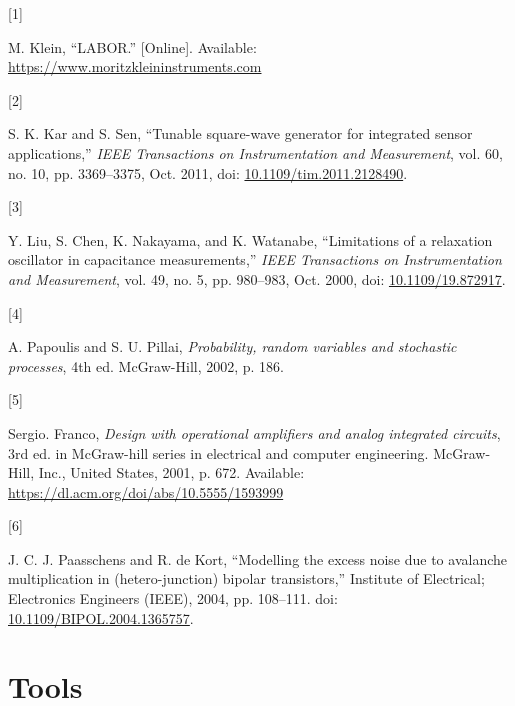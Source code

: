 \documentclass[
  11pt,
  a4paper,
  twoside]{scrbook}
\newlength{\cslhangindent}
\newlength{\csllabelwidth}
\newenvironment{CSLReferences}[2] %
 {\begin{list}{}{%
  \setlength{\itemindent}{0pt}
  \setlength{\leftmargin}{0pt}
  \setlength{\parsep}{0pt}
  \ifodd #1
   \setlength{\leftmargin}{\cslhangindent}
   \setlength{\itemindent}{-1\cslhangindent}
  \fi
  \setlength{\itemsep}{#2\baselineskip}}}
 {\end{list}}
\newcommand{\CSLLeftMargin}[1]{\parbox[t]{\csllabelwidth}{\strut#1\strut}}
\newcommand{\CSLRightInline}[1]{\parbox[t]{\linewidth - \csllabelwidth}{\strut#1\strut}}
\begin{document}

\protect{}\label{refs}
\begin{CSLReferences}{0}{0}
\CSLLeftMargin{{[}1{]} }%
\CSLRightInline{M. Klein, {``LABOR.''} {[}Online{]}. Available:
\url{https://www.moritzkleininstruments.com}}

\CSLLeftMargin{{[}2{]} }%
\CSLRightInline{S. K. Kar and S. Sen, {``Tunable square-wave generator
for integrated sensor applications,''} \emph{IEEE Transactions on
Instrumentation and Measurement}, vol. 60, no. 10, pp. 3369--3375, Oct.
2011, doi:
\href{https://doi.org/10.1109/tim.2011.2128490}{10.1109/tim.2011.2128490}.}

\CSLLeftMargin{{[}3{]} }%
\CSLRightInline{Y. Liu, S. Chen, K. Nakayama, and K. Watanabe,
{``Limitations of a relaxation oscillator in capacitance
measurements,''} \emph{IEEE Transactions on Instrumentation and
Measurement}, vol. 49, no. 5, pp. 980--983, Oct. 2000, doi:
\href{https://doi.org/10.1109/19.872917}{10.1109/19.872917}.}

\CSLLeftMargin{{[}4{]} }%
\CSLRightInline{A. Papoulis and S. U. Pillai, \emph{Probability, random
variables and stochastic processes}, 4th ed. McGraw-Hill, 2002, p. 186.}

\CSLLeftMargin{{[}5{]} }%
\CSLRightInline{Sergio. Franco, \emph{Design with operational amplifiers
and analog integrated circuits}, 3rd ed. in McGraw-hill series in
electrical and computer engineering. McGraw-Hill, Inc., United States,
2001, p. 672. Available:
\url{https://dl.acm.org/doi/abs/10.5555/1593999}}

\CSLLeftMargin{{[}6{]} }%
\CSLRightInline{J. C. J. Paasschens and R. de Kort, {``Modelling the
excess noise due to avalanche multiplication in (hetero-junction)
bipolar transistors,''} Institute of Electrical; Electronics Engineers
(IEEE), 2004, pp. 108--111. doi:
\href{https://doi.org/10.1109/BIPOL.2004.1365757}{10.1109/BIPOL.2004.1365757}.}

\end{CSLReferences}

\cleardoublepage
{}
{}
\appendix

\chapter{Tools}\label{sec-tools}
\end{document}
